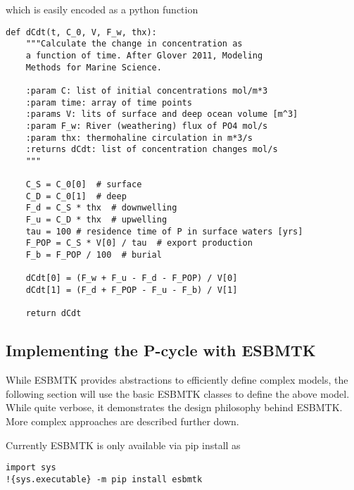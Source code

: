 \documentclass[11pt]{article}
\begin{document}
which is easily encoded as a python function
\begin{verbatim}
def dCdt(t, C_0, V, F_w, thx):
    """Calculate the change in concentration as
    a function of time. After Glover 2011, Modeling
    Methods for Marine Science.

    :param C: list of initial concentrations mol/m*3
    :param time: array of time points
    :params V: lits of surface and deep ocean volume [m^3]
    :param F_w: River (weathering) flux of PO4 mol/s
    :param thx: thermohaline circulation in m*3/s
    :returns dCdt: list of concentration changes mol/s
    """

    C_S = C_0[0]  # surface
    C_D = C_0[1]  # deep
    F_d = C_S * thx  # downwelling
    F_u = C_D * thx  # upwelling
    tau = 100 # residence time of P in surface waters [yrs]
    F_POP = C_S * V[0] / tau  # export production
    F_b = F_POP / 100  # burial

    dCdt[0] = (F_w + F_u - F_d - F_POP) / V[0]
    dCdt[1] = (F_d + F_POP - F_u - F_b) / V[1]

    return dCdt
\end{verbatim}
\subsection{Implementing the P-cycle with ESBMTK}
\label{sec:orgeba45a5}
While ESBMTK provides abstractions to efficiently define complex models, the following section will use the basic ESBMTK classes to define the above model. While quite verbose, it demonstrates the design philosophy behind ESBMTK. More complex approaches are described further down. 

Currently ESBMTK is only available via pip install as
\begin{verbatim}
import sys
!{sys.executable} -m pip install esbmtk
\end{verbatim}
\end{document}
